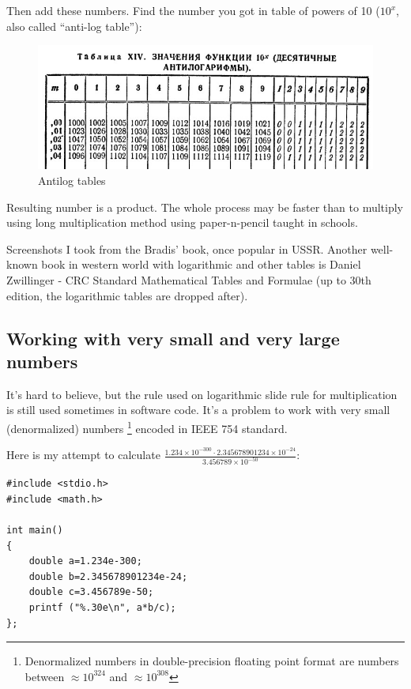 Then add these numbers. Find the number you got in table of powers of 10 ($10^{x}$, also called ``anti-log table''):

\begin{figure}[H]
\centering
\includegraphics[scale=0.66]{log/bradis2.jpg}
\caption{Antilog tables}
\end{figure}


Resulting number is a product.
The whole process may be faster than to multiply using long multiplication method using paper-n-pencil taught in schools.

Screenshots I took from the Bradis' book, once popular in USSR.
Another well-known book in western world with logarithmic and other tables is 
Daniel Zwillinger - CRC Standard Mathematical Tables and Formulae 
(up to 30th edition, the logarithmic tables are dropped after).

\subsection{Working with very small and very large numbers}

It's hard to believe, but the rule used on logarithmic slide rule for multiplication is still used sometimes in software code.
It's a problem to work with very small (denormalized) numbers
\footnote{Denormalized numbers in double-precision floating point format are numbers between $\approx 10^{324}$ and $\approx 10^{308}$} encoded in IEEE 754 standard. 

Here is my attempt to calculate $\frac{1.234 \times 10^{-300} \cdot 2.345678901234 \times 10^{-24}}{3.456789 \times 10^{-50}}$:

\begin{lstlisting}[caption=C code]
#include <stdio.h>
#include <math.h>

int main()
{
	double a=1.234e-300;
	double b=2.345678901234e-24;
	double c=3.456789e-50;
	printf ("%.30e\n", a*b/c);
};
\end{lstlisting}

